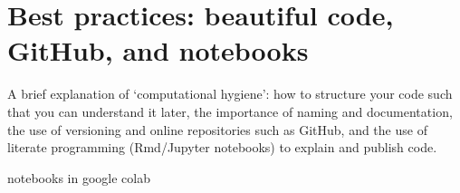 \section{Best practices: beautiful code, GitHub, and notebooks}
\label{sec:practices}


A brief explanation of ‘computational hygiene’: how to structure your code such that you can understand it later, the importance of naming and documentation, the use of versioning and online repositories such as GitHub, and the use of literate programming (Rmd/Jupyter notebooks) to explain and publish code. 

notebooks in google colab